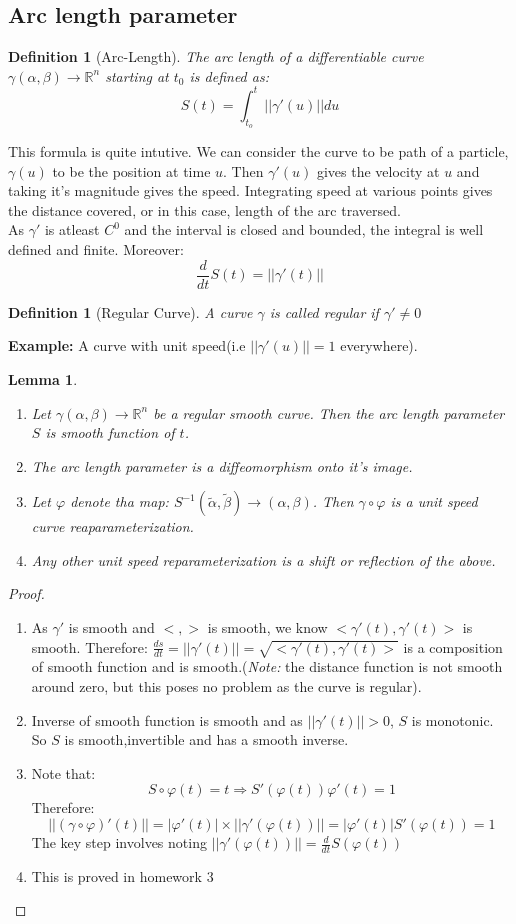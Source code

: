 \documentclass[oneside]{book}\twocolumn
\newtheorem{definition}[theorem]{Definition}
\newtheorem{lemma}[theorem]{Lemma}
\begin{document}
\subsection{Arc length parameter}
\begin{definition}[Arc-Length]
The arc length of a differentiable curve $\gamma(\alpha,\beta)\to\mathbb R^n$ starting at $t_0$ is defined as:
$$S(t)=\int_{t_o}^t||\gamma'(u)||du$$
\end{definition}
This formula is quite intutive. We can consider the curve to be path of a particle, $\gamma(u)$ to be the position at time $u$. Then $\gamma'(u)$ gives the velocity at $u$ and taking it's magnitude gives the speed. Integrating speed at various points gives the distance covered, or in this case, length of the arc traversed.\\
As $\gamma'$ is atleast $C^0$ and the interval is closed and bounded, the integral is well defined and finite. Moreover:
$$\frac{d}{dt}S(t)=||\gamma'(t)||$$
\begin{definition}[Regular Curve]
A curve $\gamma$ is called regular if $\gamma'\ne0$
\end{definition}
\textbf{Example: }A curve with unit speed(i.e $||\gamma'(u)||=1$ everywhere).
\begin{lemma}
\begin{enumerate}
    \item Let $\gamma(\alpha,\beta)\to\mathbb R^n$ be a regular smooth curve. Then the arc length parameter $S$ is smooth function of $t$.
    \item The arc length parameter is a diffeomorphism onto it's image.
    \item Let $\varphi$ denote tha map: $S^{-1}(\tilde\alpha,\tilde\beta)\to(\alpha,\beta)$. Then $\gamma\circ\varphi$ is a unit speed curve reaparameterization.
    \item Any other unit speed reparameterization is a shift or reflection of the above.
\end{enumerate}
\end{lemma}
\begin{proof}
\begin{enumerate}
    \item As $\gamma'$ is smooth and $<,>$ is smooth, we know $<\gamma'(t),\gamma'(t)>$ is smooth. Therefore:
    $\frac{ds}{dt}=||\gamma'(t)||=\sqrt{<\gamma'(t),\gamma'(t)>}$ is a composition of smooth function and is smooth.(\textit{Note:} the distance function is not smooth around zero, but this poses no problem as the curve is regular).
    \item Inverse of smooth function is smooth and as $||\gamma'(t)||>0$, $S$ is monotonic. So $S$ is smooth,invertible and has a smooth inverse.
    \item Note that:
    $$S\circ \varphi (t)=t\Rightarrow S'(\varphi(t))\varphi'(t)=1$$
    Therefore:
    $$||(\gamma\circ\varphi)'(t)||=|\varphi'(t)|\times ||\gamma'(\varphi(t)) ||=|\varphi'(t)|S'(\varphi(t))=1$$
    The key step involves noting $||\gamma'(\varphi(t))||=\frac{d}{dt}S(\varphi(t))$
    \item This is proved in homework 3
\end{enumerate}
\end{proof}
\end{document}
